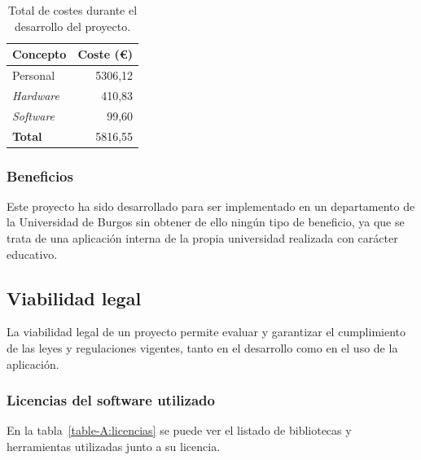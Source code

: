\begin{table}
  \centering 
  \begin{tabular}{l r}
    \toprule
    \textbf{Concepto} & \textbf{Coste (€)} \\
    \midrule
    Personal & 5306,12 \\
	\textit{Hardware} & 410,83 \\
	\textit{Software} & 99,60\\
	\midrule
	\textbf{Total} & 5816,55 \\
	\bottomrule
  \end{tabular}
\caption{Total de costes durante el desarrollo del proyecto.}\label{table-A:economía}
\end{table}


\subsubsection{Beneficios}
Este proyecto ha sido desarrollado para ser implementado en un departamento de la Universidad de Burgos sin obtener de ello ningún tipo de beneficio, ya que se trata de una aplicación interna de la propia universidad realizada con carácter educativo.

\subsection{Viabilidad legal}
La viabilidad legal de un proyecto permite evaluar y garantizar el cumplimiento de las leyes y regulaciones vigentes, tanto en el desarrollo como en el uso de la aplicación.

\subsubsection{Licencias del software utilizado}

En la tabla~\ref{table-A:licencias} se puede ver el listado de bibliotecas y herramientas utilizadas junto a su licencia.

